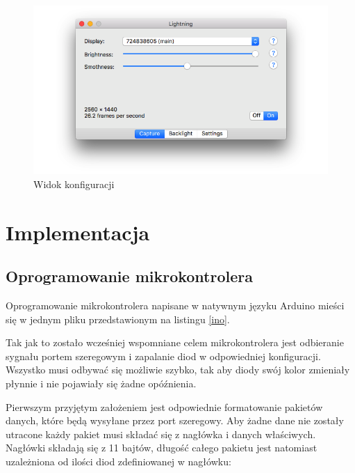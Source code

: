 \documentclass[12pt]{report}
\begin{document}
\begin{figure}[h!]
\centering
\includegraphics[width=\textwidth]{../resources/capture.png}
\caption{Widok konfiguracji}
\end{figure}

\vfill
\clearpage













\section{Implementacja}

\subsection{Oprogramowanie mikrokontrolera}

Oprogramowanie mikrokontrolera napisane w natywnym języku Arduino mieści się w jednym pliku przedstawionym na listingu \ref{ino}.

 \label{ino}

Tak jak to zostało wcześniej wspomniane celem mikrokontrolera jest odbieranie sygnału portem szeregowym i zapalanie diod w odpowiedniej konfiguracji. Wszystko musi odbywać się możliwie szybko, tak aby diody swój kolor zmieniały płynnie i nie pojawiały się żadne opóźnienia.

Pierwszym przyjętym założeniem jest odpowiednie formatowanie pakietów danych, które będą wysyłane przez port szeregowy. Aby żadne dane nie zostały utracone każdy pakiet musi składać się z nagłówka i danych właściwych. Nagłówki składają się z 11 bajtów, długość całego pakietu jest natomiast uzależniona od ilości diod zdefiniowanej w nagłówku:
\end{document}
